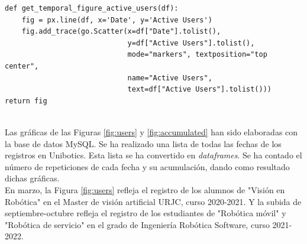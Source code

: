 \begin{lstlisting}
def get_temporal_figure_active_users(df):
    fig = px.line(df, x='Date', y='Active Users')
    fig.add_trace(go.Scatter(x=df["Date"].tolist(), 
                             y=df["Active Users"].tolist(),
                             mode="markers", textposition="top center", 
                             name="Active Users",
                             text=df["Active Users"].tolist()))
return fig
\end{lstlisting}
\\

Las gráficas de las Figuras \ref{fig:users} y \ref{fig:accumulated} han sido elaboradas con la base de datos MySQL. Se ha realizado una lista de todas las fechas de los registros en Unibotics. Esta lista se ha convertido en \textit{dataframes}. Se ha contado el número de repeticiones de cada fecha y su acumulación, dando como resultado dichas gráficas.\\
\newpage
En marzo, la Figura \ref{fig:users} refleja el registro de los alumnos de "Visión en Robótica" en el Master de visión artificial URJC, curso 2020-2021. Y la subida de septiembre-octubre refleja el registro de los estudiantes de "Robótica móvil" y "Robótica de servicio" en el grado de Ingeniería Robótica Software, curso 2021-2022.



